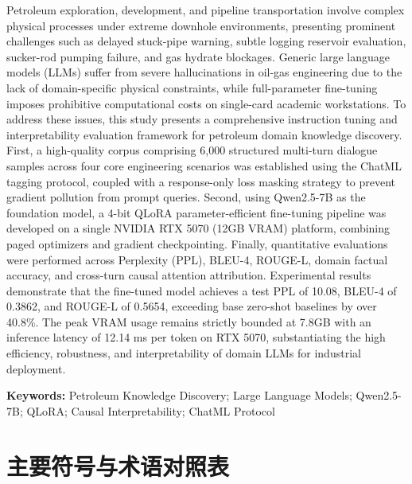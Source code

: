 \documentclass[UTF8,a4paper,zihao=-4,openany,twoside]{ctexbook}
\begin{document}
Petroleum exploration, development, and pipeline transportation involve complex physical processes under extreme downhole environments, presenting prominent challenges such as delayed stuck-pipe warning, subtle logging reservoir evaluation, sucker-rod pumping failure, and gas hydrate blockages. Generic large language models (LLMs) suffer from severe hallucinations in oil-gas engineering due to the lack of domain-specific physical constraints, while full-parameter fine-tuning imposes prohibitive computational costs on single-card academic workstations. To address these issues, this study presents a comprehensive instruction tuning and interpretability evaluation framework for petroleum domain knowledge discovery. First, a high-quality corpus comprising 6,000 structured multi-turn dialogue samples across four core engineering scenarios was established using the ChatML tagging protocol, coupled with a response-only loss masking strategy to prevent gradient pollution from prompt queries. Second, using Qwen2.5-7B as the foundation model, a 4-bit QLoRA parameter-efficient fine-tuning pipeline was developed on a single NVIDIA RTX 5070 (12GB VRAM) platform, combining paged optimizers and gradient checkpointing. Finally, quantitative evaluations were performed across Perplexity (PPL), BLEU-4, ROUGE-L, domain factual accuracy, and cross-turn causal attention attribution. Experimental results demonstrate that the fine-tuned model achieves a test PPL of 10.08, BLEU-4 of 0.3862, and ROUGE-L of 0.5654, exceeding base zero-shot baselines by over 40.8\%. The peak VRAM usage remains strictly bounded at 7.8GB with an inference latency of 12.14 ms per token on RTX 5070, substantiating the high efficiency, robustness, and interpretability of domain LLMs for industrial deployment.

\vspace{4mm}
\noindent\textbf{Keywords:} Petroleum Knowledge Discovery; Large Language Models; Qwen2.5-7B; QLoRA; Causal Interpretability; ChatML Protocol

\cleardoublepage

\pagestyle{fancy}
\tableofcontents
\cleardoublepage

\chapter*{主要符号与术语对照表}
\end{document}
